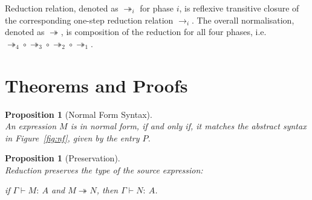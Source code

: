 \documentclass[a4paper]{article}
\newcommand{\typecolor}{}
\newcommand{\termcolor}{}
\newcommand{\tp}[1]{{\typecolor #1}}
\newcommand{\tm}[1]{{\termcolor #1}}
\newtheorem{proposition}[theorem]{Proposition}
\newtheorem{definition}{Definition}
\newcommand{\env}{\tp{\Gamma}}
\newcommand{\typing}[2]{\tm{#1:\ }\tp{#2}}
\newcommand{\txt}[1]{\text{\textit{#1}}}
\newcommand{\reduce}[3]{#1 \rightarrow_{#2} #3}
\newcommand{\reducestar}[3]{#1 \twoheadrightarrow_{#2} #3}
\newcommand{\norm}[1]{\txt{Norm}\,(#1)}
\begin{document}
Reduction relation, denoted as $\reducestar{}{i}{}$ for phase $i$, is
reflexive transitive closure of the corresponding one-step reduction
relation $\reduce{}{i}{}$. The overall normalisation, denoted as
$\reducestar{}{}{}$, is composition of the reduction for all four
phases,
i.e. $\reducestar{}{4}{}\circ\reducestar{}{3}{}\circ\reducestar{}{2}{}\circ\reducestar{}{1}{}$.

\section{Theorems and Proofs}





\begin{proposition}[Normal Form Syntax]\ \\
\label{prop_normal}
An expression $M$ is in normal form, if and only if, it matches the
abstract syntax in Figure~\ref{fig:nf}, given by the entry $P$.
\end{proposition}


\begin{proposition}[Preservation]\ \\
\label{prop_preservation}
Reduction preserves the type of the source expression:

 if $\env \vdash \typing{M}{A}$ and $\reducestar{M}{}{N}$, then
$\env \vdash \typing{N}{A}$.
\end{proposition}

\end{document}
